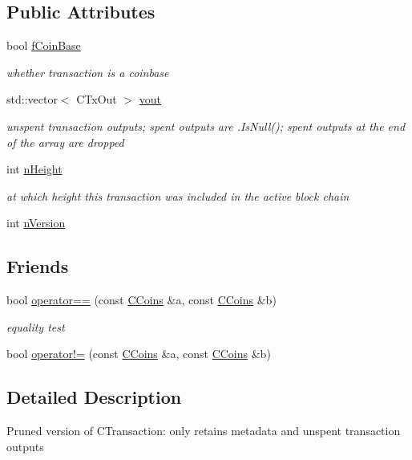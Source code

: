 \subsection*{Public Attributes}
\begin{DoxyCompactItemize}
\item 
bool \hyperlink{class_c_coins_adeedfaef84ba39b6e295d5d1fb9d8f0b}{f\+Coin\+Base}
\begin{DoxyCompactList}\small\item\em whether transaction is a coinbase \end{DoxyCompactList}\item 
std\+::vector$<$ C\+Tx\+Out $>$ \hyperlink{class_c_coins_a1dcea1a6da9b25642337e286f9f59b03}{vout}
\begin{DoxyCompactList}\small\item\em unspent transaction outputs; spent outputs are .Is\+Null(); spent outputs at the end of the array are dropped \end{DoxyCompactList}\item 
int \hyperlink{class_c_coins_af7396dfad71367de46f21cf92e2c70ab}{n\+Height}
\begin{DoxyCompactList}\small\item\em at which height this transaction was included in the active block chain \end{DoxyCompactList}\item 
int \hyperlink{class_c_coins_a96fea4ee8841e9ce32f60c2e7e3cf6b6}{n\+Version}
\end{DoxyCompactItemize}
\subsection*{Friends}
\begin{DoxyCompactItemize}
\item 
bool \hyperlink{class_c_coins_a77593e3db3e4b369c21a91aad2afcc05}{operator==} (const \hyperlink{class_c_coins}{C\+Coins} \&a, const \hyperlink{class_c_coins}{C\+Coins} \&b)
\begin{DoxyCompactList}\small\item\em equality test \end{DoxyCompactList}\item 
bool \hyperlink{class_c_coins_a42ef9fcc8ca59916b5fb69904db1c9bd}{operator!=} (const \hyperlink{class_c_coins}{C\+Coins} \&a, const \hyperlink{class_c_coins}{C\+Coins} \&b)
\end{DoxyCompactItemize}


\subsection{Detailed Description}
Pruned version of C\+Transaction\+: only retains metadata and unspent transaction outputs

